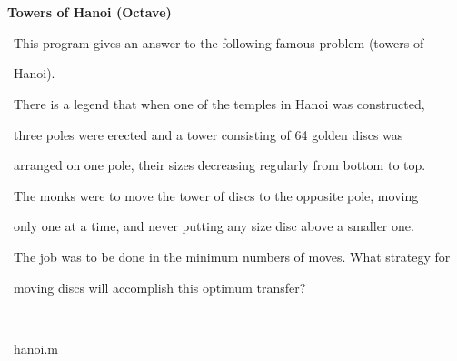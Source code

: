 \documentclass[a4paper,10pt]{article}
\def\mc{\relax}
\begin{document}
\tt\mc 

\noindent
\mbox{}\rm\mc {\tt\%} \hrulefill
\tt\mc 

\noindent
\mbox{}\rm\mc {\tt\%} \ %
\tt\mc 

\noindent
\mbox{}\rm\mc {\tt\%} \ \centerline{\bf Towers of Hanoi (Octave)}
\tt\mc 

\noindent
\mbox{}\rm\mc {\tt\%} 
\tt\mc 

\noindent
\mbox{}\rm\mc {\tt\%} \ \hspace{\leftmargini}This program gives an answer to the following famous problem (towers of
\tt\mc 

\noindent
\mbox{}\rm\mc {\tt\%} \ \hspace{\leftmargini}Hanoi).
\tt\mc 

\noindent
\mbox{}\rm\mc {\tt\%} \ \hspace{\leftmargini}There is a legend that when one of the temples in Hanoi was constructed,
\tt\mc 

\noindent
\mbox{}\rm\mc {\tt\%} \ \hspace{\leftmargini}three poles were erected and a tower consisting of 64 golden discs was
\tt\mc 

\noindent
\mbox{}\rm\mc {\tt\%} \ \hspace{\leftmargini}arranged on one pole, their sizes decreasing regularly from bottom to top.
\tt\mc 

\noindent
\mbox{}\rm\mc {\tt\%} \ \hspace{\leftmargini}The monks were to move the tower of discs to the opposite pole, moving
\tt\mc 

\noindent
\mbox{}\rm\mc {\tt\%} \ \hspace{\leftmargini}only one at a time, and never putting any size disc above a smaller one.
\tt\mc 

\noindent
\mbox{}\rm\mc {\tt\%} \ \hspace{\leftmargini}The job was to be done in the minimum numbers of moves. What strategy for
\tt\mc 

\noindent
\mbox{}\rm\mc {\tt\%} \ \hspace{\leftmargini}moving discs will accomplish this optimum transfer?
\tt\mc 

\noindent
\mbox{}\rm\mc {\tt\%} \ %
\tt\mc 

\noindent
\mbox{}\rm\mc {\tt\%} \hrulefill\ hanoi.m \ \hrulefill
\tt\mc 

\noindent
\mbox{}\hfill
\end{document}
